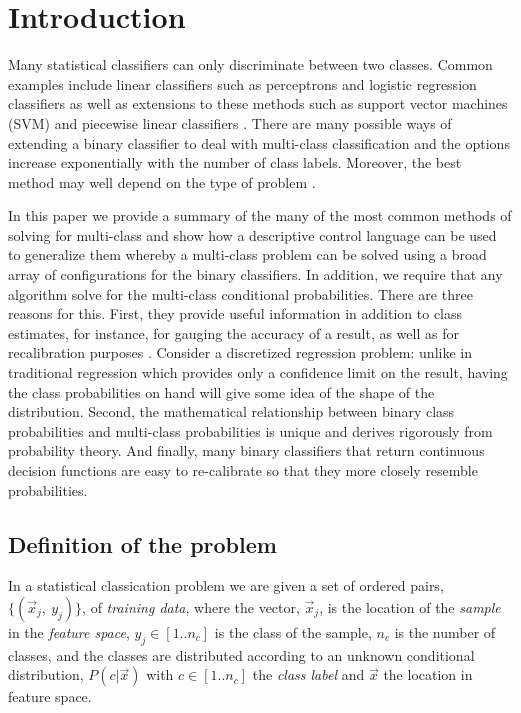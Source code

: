 \section{Introduction}

Many statistical classifiers can only discriminate between two classes.
Common examples include linear classifiers such as perceptrons and
logistic regression classifiers \citep{Michie_etal1994} as well as extensions
to these methods such as support vector machines (SVM) \citep{Mueller_etal2001} and 
piecewise linear classifiers \citep{Bagirov2005,Mills2018}.
There are many possible ways of extending a binary classifier to deal
with multi-class classification and the options increase exponentially
with the number of class labels.
Moreover, the best method may well depend on the type of problem
\citep{Dietterich_Bakiri1995,Allwein_etal2000}.

In this paper we provide a summary of the many of the most common methods of solving for 
multi-class and show how a descriptive control language can be used to 
generalize them whereby a multi-class problem
can be solved using a broad array of configurations for the binary
classifiers. 
In addition, we require that any algorithm solve 
for the multi-class conditional probabilities.
There are three reasons for this.
First, they provide useful information
in addition to class estimates,
for instance, for gauging the accuracy of a result, as well as for recalibration
purposes \citep{Mills2009}.
Consider a discretized regression problem: unlike in traditional regression
which provides only a confidence limit on the result,
having the class probabilities on hand will give some idea of the
shape of the distribution.
Second, the mathematical relationship between binary class
probabilities and multi-class probabilities is unique and
derives rigorously from probability theory.
And finally, many binary classifiers that return continuous decision functions
are easy to re-calibrate so that they more closely resemble probabilities.

\subsection{Definition of the problem}

\label{description}

In a statistical classication problem we are given a set of ordered pairs, 
$\lbrace (\vec x_j,~ y_j) \rbrace$, of {\it training data},
where the vector, $\vec x_j$, is the location of the {\it sample} in 
the {\it feature space},
$y_j \in [1..n_c]$ is the class of the sample,
$n_c$ is the number of classes,
and the classes are
distributed according to an unknown conditional distribution,
$P(c | \vec x)$ with $c \in [1..n_c]$ the {\it class label} and $\vec x$ the location
in feature space.

